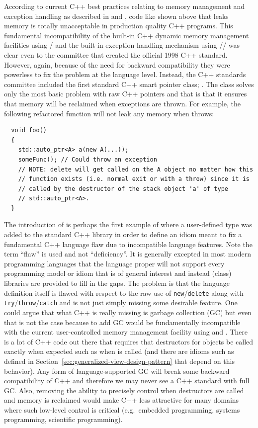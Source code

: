 \documentclass[pdf,ps2pdf,11pt]{SANDreport}
\begin{document}
According to current C++ best practices relating to memory management
and exception handling as described in {}\cite[Item
{}29]{EffectiveC++ThirdEdition} and {}\cite[Item
{}71]{C++CodingStandards05}, code like shown above that leaks memory
is totally unacceptable in production quality C++ programs.  This
fundamental incompatibility of the built-in C++ dynamic memory
management facilities using {}/ and the built-in
exception handling mechanism using
{}/{}/ was clear even to the committee
that created the official 1998 C++ standard.  However, again, because
of the need for backward compatibility they were powerless to fix the
problem at the language level.  Instead, the C++ standards committee
included the first standard C++ smart pointer class;
{}.  The class {} solves only the most
basic problem with raw C++ pointers and that is that it ensures that
memory will be reclaimed when exceptions are thrown.  For example, the
following refactored function will not leak any memory when
{} throws:

{\small\begin{verbatim}
  void foo()
  {
    std::auto_ptr<A> a(new A(...));
    someFunc(); // Could throw an exception
    // NOTE: delete will get called on the A object no matter how this
    // function exists (i.e. normal exit or with a throw) since it is
    // called by the destructor of the stack object 'a' of type
    // std::auto_ptr<A>. 
  }
\end{verbatim}}

The introduction of {} is perhaps the first
example of where a user-defined type was added to the standard C++
library in order to define an idiom meant to fix a fundamental C++
language flaw due to incompatible language features.  Note the term
``flaw'' is used and not ``deficiency''.  It is generally excepted in
most modern programming languages that the language proper will not
support every programming model or idiom that is of general interest
and instead (class) libraries are provided to fill in the gaps.  The
problem is that the language definition itself is flawed with respect
to the raw use of {}\texttt{new}/\texttt{delete} along with
{}\texttt{try}/\texttt{throw}/\texttt{catch} and is not just simply
missing some desirable feature.  One could argue that what C++ is
really missing is garbage collection (GC) but even that is not the
case because to add GC would be fundamentally incompatible with the
current user-controlled memory management facility using {}
and {}.  There is a lot of C++ code out there that
requires that destructors for objects be called exactly when expected
such as when {} is called (and there are idioms such as
defined in Section~\ref{sec:generalized-view-design-pattern} that
depend on this behavior).  Any form of language-supported GC will
break some backward compatibility of C++ and therefore we may never
see a C++ standard with full GC.  Also, removing the ability to
precisely control when destructors are called and memory is reclaimed
would make C++ less attractive for many domains where such low-level
control is critical (e.g.\ embedded programming, systems programming,
scientific programming).
\end{document}
